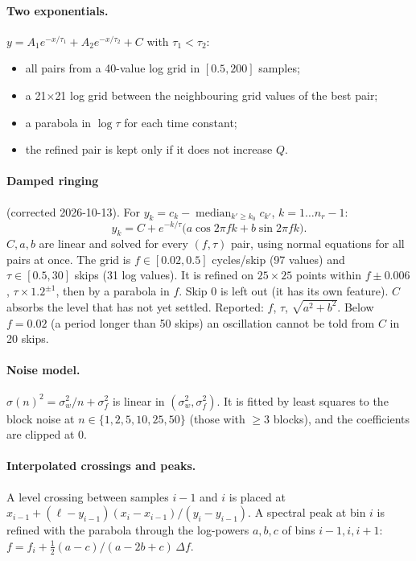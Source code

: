 \documentclass[10pt]{article}
\newcommand{\med}{\operatorname*{median}}
\newcommand{\ko}{k_0}
\begin{document}
\paragraph{Two exponentials.} $y = A_1 e^{-x/\tau_1} + A_2 e^{-x/\tau_2} + C$ with $\tau_1 < \tau_2$:
\begin{itemize}
\item all pairs from a 40-value log grid in $[0.5, 200]$ samples;
\item a 21$\times$21 log grid between the neighbouring grid values of the best pair;
\item a parabola in $\log\tau$ for each time constant;
\item the refined pair is kept only if it does not increase $Q$.
\end{itemize}

\paragraph{Damped ringing} (corrected 2026-10-13). For $y_k = c_k - \med_{k' \ge \ko} c_{k'}$, $k = 1 \dots n_r - 1$:
\begin{equation}
y_k = C + e^{-k/\tau}\bigl(a\cos 2\pi f k + b\sin 2\pi f k\bigr).
\end{equation}
$C, a, b$ are linear and solved for every $(f, \tau)$ pair, using normal equations for all pairs at once. The grid is $f \in [0.02, 0.5]$
cycles/skip (97 values) and $\tau \in [0.5, 30]$ skips (31 log values). It is refined on $25\times25$ points within
$f \pm 0.006$, $\tau \times 1.2^{\pm1}$, then by a parabola in $f$. Skip 0 is left out (it has its own feature). $C$ absorbs the level that
has not yet settled. Reported: $f$, $\tau$, $\sqrt{a^2+b^2}$. Below $f = 0.02$ (a period longer than 50 skips) an oscillation cannot be
told from $C$ in 20 skips.

\paragraph{Noise model.} $\sigma(n)^2 = \sigma_w^2/n + \sigma_f^2$ is linear in $(\sigma_w^2, \sigma_f^2)$. It is fitted by least squares
to the block noise at $n \in \{1, 2, 5, 10, 25, 50\}$ (those with $\ge 3$ blocks), and the coefficients are clipped at 0.

\paragraph{Interpolated crossings and peaks.} A level crossing between samples $i-1$ and $i$ is placed at
$x_{i-1} + (\ell - y_{i-1})(x_i - x_{i-1})/(y_i - y_{i-1})$. A spectral peak at bin $i$ is refined with the parabola through the
log-powers $a, b, c$ of bins $i-1, i, i+1$: $f = f_i + \tfrac12 (a - c)/(a - 2b + c)\,\Delta f$.
\end{document}
